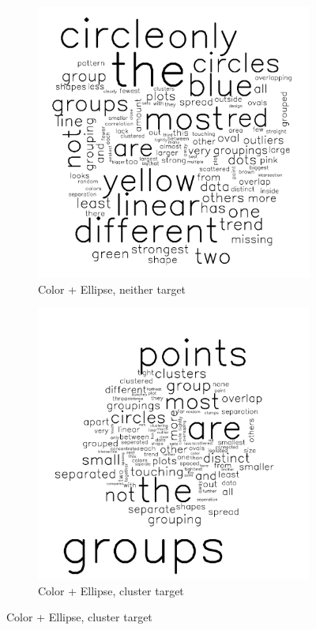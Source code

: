 \documentclass[11pt]{isuthesis}\usepackage[]{graphicx}\usepackage[]{color}
\begin{document}
\begin{figure}[ht]
\begin{subfigure}[t]{0.25\linewidth}
  \caption{Color + Ellipse, neither target}
  \includegraphics[width=\linewidth]{fig-sentiment-10}
\end{subfigure}
\begin{subfigure}[t]{0.25\linewidth}
  \caption{Color + Ellipse, cluster target}
  \includegraphics[width=\linewidth]{fig-sentiment-11}

\end{subfigure}
\end{figure}
\end{document}
